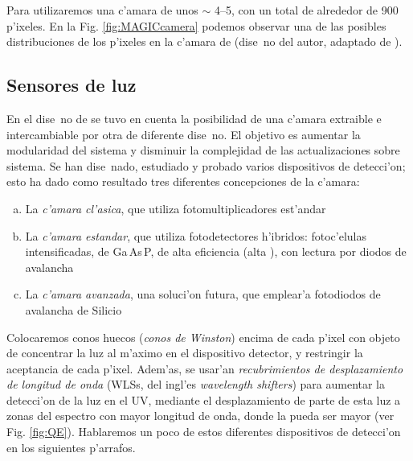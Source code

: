 \MAGICcamerafig

Para \MAGIC utilizaremos una c'amara de unos $\sim$ 4\deg--5\deg, con
un total de alrededor de 900 p'ixeles. 
En la Fig. \ref{fig:MAGICcamera} podemos observar una de las posibles
distribuciones de los p'ixeles en la c'amara de \MAGIC (dise~no del
autor, adaptado de ).

\QuantumEfffig

\subsection{Sensores de luz}
%
En el dise~no de \MAGIC se tuvo en cuenta la posibilidad de una
c'amara extraible e intercambiable por otra de diferente dise~no. El
objetivo es aumentar la modularidad del sistema y disminuir la
complejidad de las actualizaciones sobre sistema. Se han dise~nado,
estudiado y probado varios dispositivos de detecci'on; esto ha dado
como resultado tres diferentes concepciones de la c'amara:
%
\begin{enumerate}[a.]
\item La \emph{c'amara cl'asica}, que utiliza fotomultiplicadores est'andar
%
\item La \emph{c'amara estandar}, que utiliza fotodetectores h'ibridos:
fotoc'elulas intensificadas, de Ga\,As\,P, de alta eficiencia (alta
\QE), con lectura por diodos de avalancha
%
\item La \emph{c'amara avanzada}, una soluci'on futura, que emplear'a
fotodiodos de avalancha de Silicio
\end{enumerate}
%
Colocaremos conos huecos (\emph{conos de Winston}) encima de cada
p'ixel con objeto de concentrar la luz al m'aximo en el dispositivo
detector, y restringir la aceptancia de cada p'ixel. Adem'as, se
usar'an \emph{recubrimientos de desplazamiento de longitud de onda}
(WLSs, del ingl'es \emph{wavelength shifters}) para aumentar la
detecci'on de la luz \Cherenkov en el UV, mediante el desplazamiento
de parte de esta luz a zonas del espectro con mayor longitud de onda,
donde la \QE pueda ser mayor (ver Fig. \ref{fig:QE}). Hablaremos un
poco de estos diferentes dispositivos de detecci'on en los siguientes
p'arrafos.

\pixelreadoutfig

